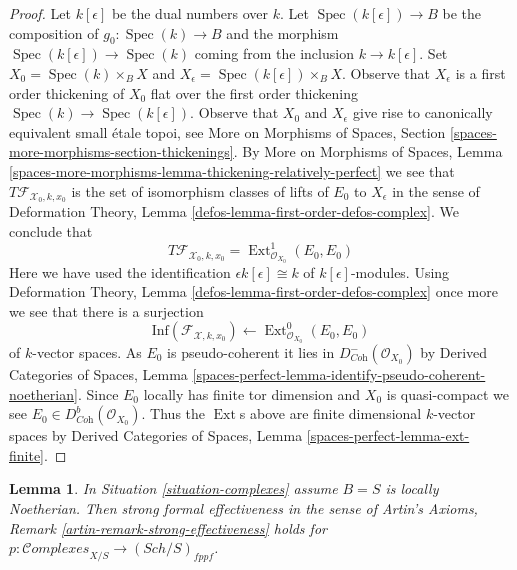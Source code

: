 \documentclass{stacks-project}
\theoremstyle{plain}
\newtheorem{lemma}[subsection]{Lemma}
\theoremstyle{definition}
\theoremstyle{remark}
\numberwithin{equation}{subsection}
\def\Spec{\mathop{\mathrm{Spec}}}
\def\Ext{\mathop{\mathrm{Ext}}\nolimits}
\def\Sch{\mathit{Sch}}
\def\Complexesstack{\mathcal{C}\!\mathit{omplexes}}
\begin{document}
\begin{proof}
\medskip\noindent
Let $k[\epsilon]$ be the dual numbers over $k$.
Let $\Spec(k[\epsilon]) \to B$ be the composition of $g_0 : \Spec(k) \to B$
and the morphism $\Spec(k[\epsilon]) \to \Spec(k)$
coming from the inclusion $k \to k[\epsilon]$.
Set $X_0 = \Spec(k) \times_B X$ and
$X_\epsilon = \Spec(k[\epsilon]) \times_B X$.
Observe that $X_\epsilon$ is a first order thickening of $X_0$
flat over the first order thickening $\Spec(k) \to \Spec(k[\epsilon])$.
Observe that $X_0$ and $X_\epsilon$ give rise to canonically equivalent
small \'etale topoi, see
More on Morphisms of Spaces, Section
\ref{spaces-more-morphisms-section-thickenings}.
By More on Morphisms of Spaces, Lemma
\ref{spaces-more-morphisms-lemma-thickening-relatively-perfect}
we see that $T\mathcal{F}_{\mathcal{X}_0, k, x_0}$ is the set of
isomorphism classes of lifts of $E_0$ to $X_\epsilon$ in the sense of
Deformation Theory, Lemma \ref{defos-lemma-first-order-defos-complex}.
We conclude that
$$
T\mathcal{F}_{\mathcal{X}_0, k, x_0} =
\Ext^1_{\mathcal{O}_{X_0}}(E_0, E_0)
$$
Here we have used the identification $\epsilon k[\epsilon] \cong k$
of $k[\epsilon]$-modules. Using
Deformation Theory, Lemma \ref{defos-lemma-first-order-defos-complex}
once more we see that there is a surjection
$$
\text{Inf}(\mathcal{F}_{\mathcal{X}, k, x_0})
\leftarrow
\Ext^0_{\mathcal{O}_{X_0}}(E_0, E_0)
$$
of $k$-vector spaces. As $E_0$ is pseudo-coherent it lies in
$D^-_{\textit{Coh}}(\mathcal{O}_{X_0})$ by
Derived Categories of Spaces, Lemma
\ref{spaces-perfect-lemma-identify-pseudo-coherent-noetherian}.
Since $E_0$ locally has finite tor dimension and $X_0$
is quasi-compact we see $E_0 \in D^b_{\textit{Coh}}(\mathcal{O}_{X_0})$.
Thus the $\Ext$s above are finite dimensional $k$-vector spaces
by Derived Categories of Spaces, Lemma
\ref{spaces-perfect-lemma-ext-finite}.
\end{proof}

\begin{lemma}
\label{lemma-complexes-strong-effectiveness}
In Situation \ref{situation-complexes} assume $B = S$ is locally Noetherian.
Then strong formal effectiveness in the sense of
Artin's Axioms, Remark \ref{artin-remark-strong-effectiveness}
holds for $p : \Complexesstack_{X/S} \to (\Sch/S)_{fppf}$.
\end{lemma}
\end{document}
